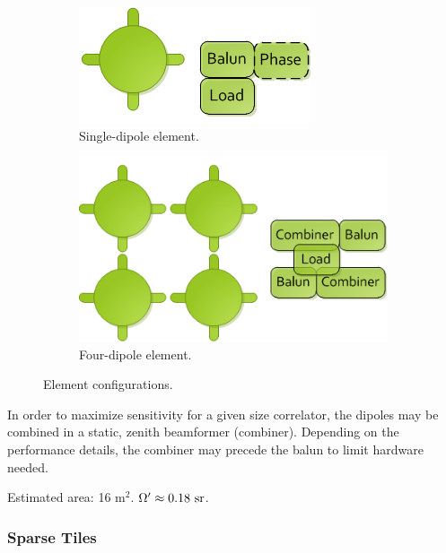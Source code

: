 \documentclass[11pt]{article}
\begin{document}
\begin{figure}
\begin{subfigure}[h]{0.5\textwidth}
\centering
\includegraphics[width=\textwidth]{plots/Element1.png}
\caption{Single-dipole element.}
\label{fig:element1}
\end{subfigure}
\begin{subfigure}{0.5\textwidth}
\centering
\includegraphics[width=\textwidth]{plots/Element4.png}
\caption{Four-dipole element.}
\label{fig:element4}
\end{subfigure}
\caption{Element configurations.}
\label{fig:elements}
\end{figure}

In order to maximize sensitivity for a given size correlator, the dipoles may
be combined in a static, zenith beamformer (combiner).  Depending on the
performance details, the combiner may precede the balun to limit hardware
needed.

Estimated area: 16 m$^2$.  $\Omega^\prime\approx0.18\ {\rm sr}$.

\subsubsection{Sparse Tiles}
\end{document}
